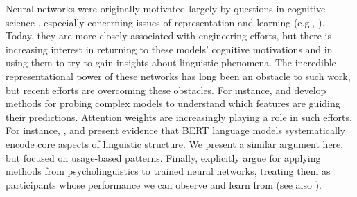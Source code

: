 \documentclass[11pt,a4paper]{article}
\begin{document}
Neural networks were originally motivated largely by questions in cognitive science \citep{pater2019generative}, especially concerning issues of representation and learning (e.g., \citep{rumelhart1986learning,tesar2000learnability}). Today, they are more closely associated with engineering efforts, but there is increasing interest in returning to these models' cognitive motivations and in using them to try to gain insights about linguistic phenomena. The incredible representational power of these networks has long been an obstacle to such work, but recent efforts are overcoming these obstacles. For instance, \citet{N16-3020} and \citet{Koh:Liang:2017} develop methods for probing complex models to understand which features are guiding their predictions. Attention weights are increasingly playing a role in such efforts. For instance, \citet{jawahar-etal-2019-bert}, \citet{clark2019what} and \citet{tenney-etal-2019-bert} present evidence that BERT language models systematically encode core aspects of linguistic structure. We present a similar argument here, but focused on usage-based patterns. Finally, \citet{linzen-etal-2016-assessing} explicitly argue for applying methods from psycholinguistics to trained neural networks, treating them as participants whose performance we can observe and learn from (see also \citealt{gulordava-etal-2018-colorless,Futrell-etal:2019}).

\end{document}
